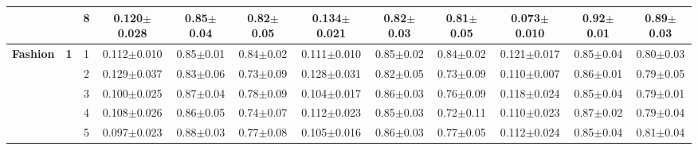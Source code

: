 \begin{table*}
{\begin{tabular}{|l|c|c||c|c|c||c|c|c||c|c|c|}
 & & 8 & \textcolor{gate_color}{0.120$\pm$0.028} & \textcolor{gate_color}{0.85$\pm$0.04} & \textcolor{gate_color}{0.82$\pm$0.05} & \textcolor{mixed_color}{0.134$\pm$0.021} & \textcolor{mixed_color}{0.82$\pm$0.03} & \textcolor{mixed_color}{0.81$\pm$0.05} & \textcolor{pulsed_color}{0.073$\pm$0.010} & \textcolor{pulsed_color}{0.92$\pm$0.01} & \textcolor{pulsed_color}{0.89$\pm$0.03} \\
\hline\hline
\multirow{12}{*}{\textbf{Fashion}} & \multirow{8}{*}{\textbf{1}} & 1 & \textcolor{gate_color}{0.112$\pm$0.010} & \textcolor{gate_color}{0.85$\pm$0.01} & \textcolor{gate_color}{0.84$\pm$0.02} & \textcolor{mixed_color}{0.111$\pm$0.010} & \textcolor{mixed_color}{0.85$\pm$0.02} & \textcolor{mixed_color}{0.84$\pm$0.02} & \textcolor{pulsed_color}{0.121$\pm$0.017} & \textcolor{pulsed_color}{0.85$\pm$0.04} & \textcolor{pulsed_color}{0.80$\pm$0.03} \\
 & & 2 & \textcolor{gate_color}{0.129$\pm$0.037} & \textcolor{gate_color}{0.83$\pm$0.06} & \textcolor{gate_color}{0.73$\pm$0.09} & \textcolor{mixed_color}{0.128$\pm$0.031} & \textcolor{mixed_color}{0.82$\pm$0.05} & \textcolor{mixed_color}{0.73$\pm$0.09} & \textcolor{pulsed_color}{0.110$\pm$0.007} & \textcolor{pulsed_color}{0.86$\pm$0.01} & \textcolor{pulsed_color}{0.79$\pm$0.05} \\
 & & 3 & \textcolor{gate_color}{0.100$\pm$0.025} & \textcolor{gate_color}{0.87$\pm$0.04} & \textcolor{gate_color}{0.78$\pm$0.09} & \textcolor{mixed_color}{0.104$\pm$0.017} & \textcolor{mixed_color}{0.86$\pm$0.03} & \textcolor{mixed_color}{0.76$\pm$0.09} & \textcolor{pulsed_color}{0.118$\pm$0.024} & \textcolor{pulsed_color}{0.85$\pm$0.04} & \textcolor{pulsed_color}{0.79$\pm$0.01} \\
 & & 4 & \textcolor{gate_color}{0.108$\pm$0.026} & \textcolor{gate_color}{0.86$\pm$0.05} & \textcolor{gate_color}{0.74$\pm$0.07} & \textcolor{mixed_color}{0.112$\pm$0.023} & \textcolor{mixed_color}{0.85$\pm$0.03} & \textcolor{mixed_color}{0.72$\pm$0.11} & \textcolor{pulsed_color}{0.110$\pm$0.023} & \textcolor{pulsed_color}{0.87$\pm$0.02} & \textcolor{pulsed_color}{0.79$\pm$0.04} \\
 & & 5 & \textcolor{gate_color}{0.097$\pm$0.023} & \textcolor{gate_color}{0.88$\pm$0.03} & \textcolor{gate_color}{0.77$\pm$0.08} & \textcolor{mixed_color}{0.105$\pm$0.016} & \textcolor{mixed_color}{0.86$\pm$0.03} & \textcolor{mixed_color}{0.77$\pm$0.05} & \textcolor{pulsed_color}{0.112$\pm$0.024} & \textcolor{pulsed_color}{0.85$\pm$0.04} & \textcolor{pulsed_color}{0.81$\pm$0.04} \\

\end{tabular}}
\end{table*}
